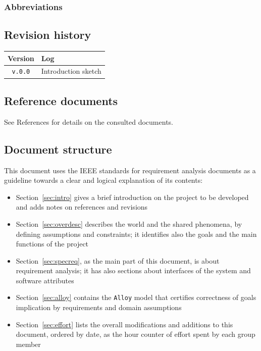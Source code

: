 \documentclass[12pt]{article}
\begin{document}
    \subsubsection{Abbreviations}

      \begin{description}
        \item[]
      \end{description}

  \subsection{Revision history}
  
  \label{sec:revhistory}
    \begin{table}[!h]
      \begin{tabular}{|c|l|}
        \hline
        \textbf{Version}                & \textbf{Log} \\ \hline
        \texttt{v.0.0} &
          Introduction sketch
        \\ \hline
      \end{tabular}
    \end{table}

  \subsection{Reference documents}

    See References for details on the consulted documents.

  \subsection{Document structure}

    This document uses the IEEE standards for requirement analysis documents as a guideline towards a clear and logical explanation of its contents:
    \begin{itemize}
      \item Section~\ref{sec:intro} gives a brief introduction on the project to be developed and adds notes on references and revisions
      \item Section~\ref{sec:overdesc} describes the world and the shared phenomena, by defining assumptions and constraints; it identifies also the goals and the main functions of the project
      \item Section~\ref{sec:specreq}, as the main part of this document, is about requirement analysis; it has also sections about interfaces of the system and software attributes
      \item Section~\ref{sec:alloy} contains the \texttt{Alloy} model that certifies correctness of goals implication by requirements and domain assumptions
      \item Section~\ref{sec:effort} lists the overall modifications and additions to this document, ordered by date, as the hour counter of effort spent by each group member
    \end{itemize}
\end{document}
